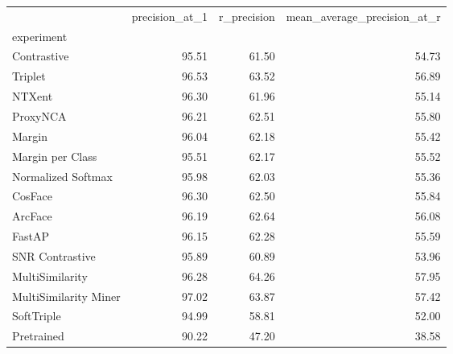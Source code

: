 \begin{tabular}{lrrr}
\toprule
 & precision_at_1 & r_precision & mean_average_precision_at_r \\
experiment &  &  &  \\
\midrule
Contrastive & 95.51 & 61.50 & 54.73 \\
Triplet & 96.53 & 63.52 & 56.89 \\
NTXent & 96.30 & 61.96 & 55.14 \\
ProxyNCA & 96.21 & 62.51 & 55.80 \\
Margin & 96.04 & 62.18 & 55.42 \\
Margin per Class & 95.51 & 62.17 & 55.52 \\
Normalized Softmax & 95.98 & 62.03 & 55.36 \\
CosFace & 96.30 & 62.50 & 55.84 \\
ArcFace & 96.19 & 62.64 & 56.08 \\
FastAP & 96.15 & 62.28 & 55.59 \\
SNR Contrastive & 95.89 & 60.89 & 53.96 \\
MultiSimilarity & 96.28 & 64.26 & 57.95 \\
MultiSimilarity Miner & 97.02 & 63.87 & 57.42 \\
SoftTriple & 94.99 & 58.81 & 52.00 \\
Pretrained & 90.22 & 47.20 & 38.58 \\
\bottomrule
\end{tabular}
